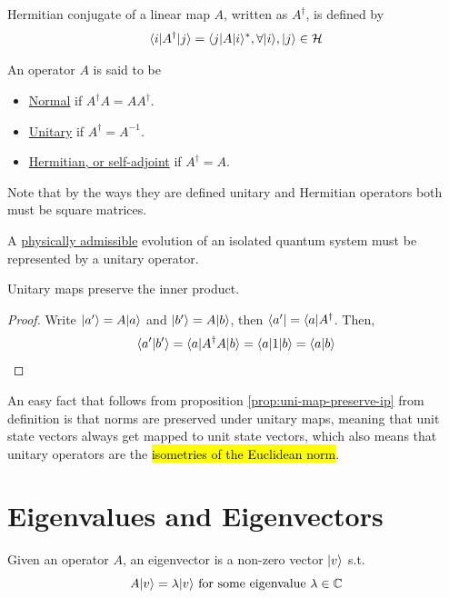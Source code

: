 \documentclass[12pt]{article}
\begin{document}
\begin{definition}
Hermitian conjugate of a linear map $A$, written as $A^\dag$, is defined by $$
\Bra{i}A^\dag\Ket{j} = \Bra{j}A\Ket{i}^*,\forall \Ket{i}, \Ket{j}\in \HHH
$$
\end{definition}

\begin{definition}
An operator $A$ is said to be
\begin{itemize}
    \item \underline{Normal} if $A^\dag A = AA^\dag$.
    \item \underline{Unitary} if $A^\dag = A^{-1}$.
    \item \underline{Hermitian, or self-adjoint} if $A^\dag = A$.
\end{itemize}
Note that by the ways they are defined unitary and Hermitian operators both must be square matrices.
\end{definition}

\begin{definition}
A \underline{physically admissible} evolution of an isolated quantum system must be represented by a unitary operator.
\end{definition}

\begin{proposition}\label{prop:uni-map-preserve-ip}
Unitary maps preserve the inner product.
\end{proposition}
\begin{proof}
Write $\Ket{a'} = A\Ket{a}$ and $\Ket{b'} = A\Ket{b}$, then $\Bra{a'} = \Bra{a}A^\dag$. Then, $$
\bk{a'}{b'} = \Bra{a}A^\dag A\Ket{b} = \Bra{a}1\Ket{b} = \bk{a}{b}
$$
\end{proof}

\begin{fact}
An easy fact that follows from proposition \ref{prop:uni-map-preserve-ip} from definition is that norms are preserved under unitary maps, meaning that unit state vectors always get mapped to unit state vectors, which also means that unitary operators are the \hl{isometries of the Euclidean norm}.
\end{fact}

\section{Eigenvalues and Eigenvectors}
\begin{definition}[Operator]  Given an operator $A$, an eigenvector is a non-zero vector $\Ket{v}$ s.t. $$
    A\Ket{v} = \lambda \Ket{v}\text{ for some eigenvalue } \lambda \in \CC
$$
\end{definition}
\end{document}
